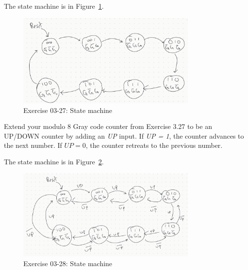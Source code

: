 \documentclass[12pt]{article}
\newenvironment{ex}[2][Exercise]{\begin{trivlist}
		\item[\hskip \labelsep {\bfseries #1}\hskip \labelsep {\bfseries #2.}]}{\end{trivlist}}
\newenvironment{sol}[1][Solution]{\begin{trivlist}
		\item[\hskip \labelsep {\bfseries #1:}]}{\end{trivlist}}
\begin{document}
\begin{sol}
	The state machine is in Figure~\ref{03-27-state-machine}.
	\begin{figure}
		\centering
		\includegraphics[width=0.8\textwidth]{03-27-state-machine}
		\caption{Exercise 03-27: State machine}
		\label{03-27-state-machine}
	\end{figure}
\end{sol}

\begin{ex}{3.28}
	Extend your modulo 8 Gray code counter from Exercise 3.27 to be an UP/DOWN counter
	by adding an \emph{UP} input. If \emph{UP = 1}, the counter advances to the next number.
	If $UP=0$, the counter retreats to the previous number.
\end{ex}

\begin{sol}
	The state machine is in Figure~\ref{03-28-state-machine}.
	\begin{figure}
		\centering
		\includegraphics[width=0.8\textwidth]{03-28-state-machine}
		\caption{Exercise 03-28: State machine}
		\label{03-28-state-machine}
	\end{figure}
\end{sol}
\end{document}
